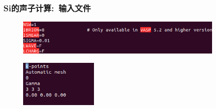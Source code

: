 \frame
{
	\frametitle{\textrm{Si}的声子计算:~输入文件}
	{\fontsize{7.2pt}{5.2pt}}%
\begin{figure}[h!]
\centering
\includegraphics[width=4.0in,viewport=0 0 640 110,clip]{Figures/Si_phonon-INCAR.png}
\caption{\fontsize{6.2pt}{5.2pt}}%
\label{Si_phonon-INCAR}
\end{figure}
\begin{figure}[h!]
\centering
\vskip -20pt
\includegraphics[height=0.9in,viewport=0 20 160 130,clip]{Figures/Si_phonon-KPOINTS.png}
\caption{\fontsize{6.2pt}{5.2pt}}%
\label{Si_phonon-KPOINTS}
\end{figure}
{\fontsize{7.2pt}{5.2pt}}
}

